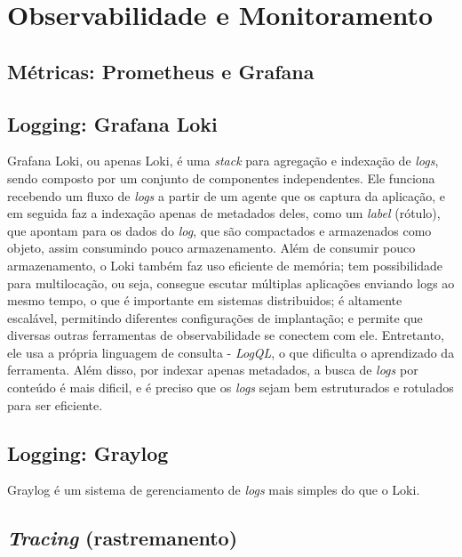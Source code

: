 \section{Observabilidade e Monitoramento}

\subsection{Métricas: Prometheus e Grafana}

\subsection{Logging: Grafana Loki}
Grafana Loki, ou apenas Loki, é uma \emph{stack} para agregação e indexação de \emph{logs}, sendo composto por um conjunto de componentes independentes. Ele funciona recebendo um fluxo de \emph{logs} a partir de um agente que os captura da aplicação, e em seguida faz a indexação apenas de metadados deles, como um \emph{label} (rótulo), que apontam para os dados do \emph{log}, que são compactados e armazenados como objeto, assim consumindo pouco armazenamento. Além de consumir pouco armazenamento, o Loki também faz uso eficiente de memória; tem possibilidade para multilocação, ou seja, consegue escutar múltiplas aplicações enviando logs ao mesmo tempo, o que é importante em sistemas distribuidos; é altamente escalável, permitindo diferentes configurações de implantação; e permite que diversas outras ferramentas de observabilidade se conectem com ele. Entretanto, ele usa a própria linguagem de consulta - \emph{LogQL}, o que dificulta o aprendizado da ferramenta. Além disso, por indexar apenas metadados, a busca de \emph{logs} por conteúdo é mais dificil, e é preciso que os \emph{logs} sejam bem estruturados e rotulados para ser eficiente. \cite{grafana-loki}

\subsection{Logging: Graylog}
  Graylog é um sistema de gerenciamento de \emph{logs} mais simples do que o Loki.

\subsection{\emph{Tracing} (rastremanento)}
  
